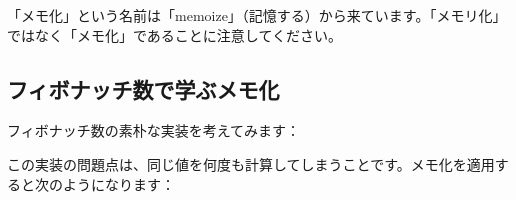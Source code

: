 「メモ化」という名前は「memoize」（記憶する）から来ています。「メモリ化」ではなく「メモ化」であることに注意してください。

\hypertarget{chapter5-ux30d5ux30a3ux30dcux30caux30c3ux30c1ux6570ux3067ux5b66ux3076ux30e1ux30e2ux5316}{%
\subsection{フィボナッチ数で学ぶメモ化}\label{chapter5-ux30d5ux30a3ux30dcux30caux30c3ux30c1ux6570ux3067ux5b66ux3076ux30e1ux30e2ux5316}}

フィボナッチ数の素朴な実装を考えてみます：

\begin{Shaded}
\begin{Highlighting}[]
   \NormalTok{(}
    \NormalTok{) } \NormalTok{;}
    \NormalTok{) } \NormalTok{;}
      \NormalTok{) + }\NormalTok{); }
\NormalTok{\}}
\end{Highlighting}
\end{Shaded}

この実装の問題点は、同じ値を何度も計算してしまうことです。メモ化を適用すると次のようになります：

\begin{Shaded}
\begin{Highlighting}[]
  \NormalTok{\textless{}}\NormalTok{, } \NormalTok{\textless{}\textgreater{}();}

   \NormalTok{(}
    \NormalTok{) }

    \NormalTok{) \{}
\NormalTok{;}
\NormalTok{    \} } \NormalTok{) \{}
\NormalTok{;}
\NormalTok{    \} }\NormalTok{ \{}
\NormalTok{) + }\NormalTok{);}
\NormalTok{    \}}
\NormalTok{\}}
\end{Highlighting}
\end{Shaded}

